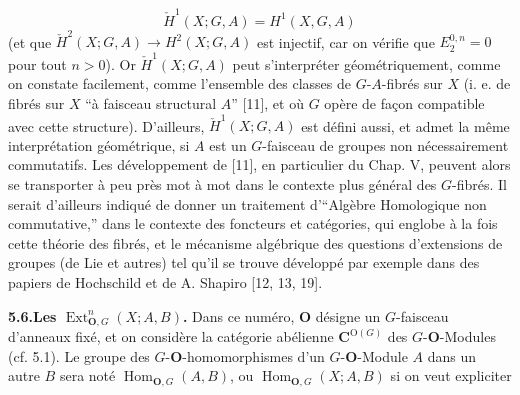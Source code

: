 \[
\check H^1(X;G,A)=H^1(X,G,A)
\]
 (et que $\check H^2(X;G,A)\to H^2(X;G,A)$ est injectif, car on
vérifie que $E_2^{0,n}=0$ pour tout $n>0$).
Or $\check H^1(X;G,A)$ peut s'interpréter géométriquement, comme on constate
facilement, comme l'ensemble des classes de $G$-$A$-fibrés sur $X$ (i. e. de
fibrés sur $X$ ``à faisceau structural $A$'' [11], et où $G$ opère de façon
compatible avec cette structure). D'ailleurs, $\check H^1(X;G,A)$ est défini
aussi, et admet la même interprétation géométrique, si $A$ est un $G$-faisceau
de groupes non nécessairement commutatifs. Les développement de [11], en
particulier du Chap. V, peuvent alors se transporter à peu près mot à mot dans
le contexte plus général des $G$-fibrés. Il serait d'ailleurs indiqué de donner
un traitement d'``Algèbre Homologique non commutative,'' dans le contexte des
foncteurs et catégories, qui englobe à la fois cette théorie des fibrés, et le
mécanisme algébrique des questions d'extensions de groupes (de Lie et autres)
tel qu'il se trouve développé par exemple dans des papiers de Hochschild et de
A. Shapiro [12, 13, 19].

\textbf{5.6.\quad Les $\operatorname{Ext}^n_{{\mathbf O},G}(X;A,B)$.}
Dans ce numéro, ${\mathbf O}$ désigne un $G$-faisceau d'anneaux fixé, et on considère la
catégorie abélienne ${\mathbf C}^{\mathrm O(G)}$ des $G$-${\mathbf O}$-Modules (cf. 5.1).
Le groupe des $G$-${\mathbf O}$-homomorphismes d'un $G$-${\mathbf O}$-Module $A$ dans un autre
$B$ sera noté $\operatorname{Hom}_{{\mathbf O},G}(A,B)$, ou
$\operatorname{Hom}_{{\mathbf O},G}(X;A,B)$ si on veut expliciter

